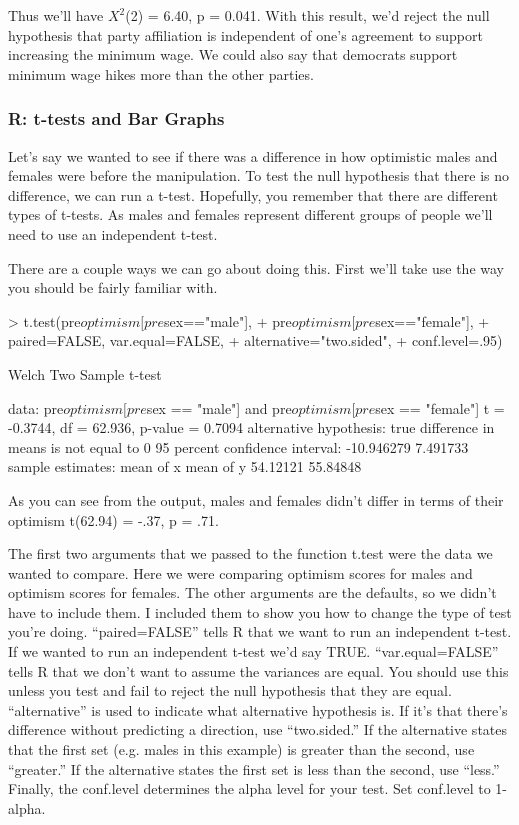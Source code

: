 \documentclass[12pt]{article}
\begin{document}
Thus we'll have $X^{2}$(2) = 
6.40, p = 
0.041. With this result, we'd reject the
null hypothesis that party affiliation is independent of one's agreement to support
increasing the minimum wage. We could also say that democrats support minimum wage hikes
more than the other parties.

\subsubsection{R: t-tests and Bar Graphs}
Let's say we wanted to see if there was a difference in how optimistic males and females
were before the manipulation. To test the null hypothesis that there is no difference,
we can run a t-test. Hopefully, you remember that there are different types of t-tests.
As males and females represent different groups of people we'll need to use an
independent t-test.

There are a couple ways we can go about doing this. First we'll take use the
way you should be fairly familiar with.

\begin{Schunk}
\begin{Sinput}
> t.test(pre$optimism[pre$sex=="male"],
+        pre$optimism[pre$sex=="female"],
+        paired=FALSE, var.equal=FALSE,
+        alternative="two.sided",
+        conf.level=.95)
\end{Sinput}
\begin{Soutput}
	Welch Two Sample t-test

data:  pre$optimism[pre$sex == "male"] and pre$optimism[pre$sex == "female"]
t = -0.3744, df = 62.936, p-value = 0.7094
alternative hypothesis: true difference in means is not equal to 0
95 percent confidence interval:
 -10.946279   7.491733
sample estimates:
mean of x mean of y 
 54.12121  55.84848 
\end{Soutput}
\end{Schunk}

As you can see from the output, males and females didn't differ in terms of their optimism
t(62.94) = -.37, p = .71.

The first two arguments that we passed to the function t.test were the data we wanted to
compare. Here we were comparing optimism scores for males and optimism scores for
females. The other arguments are the defaults, so we didn't have to include them. I
included them to show you how to change the type of test you're doing. ``paired=FALSE'' tells
R that we want to run an independent t-test. If we wanted to run an independent t-test
we'd say TRUE. ``var.equal=FALSE'' tells R that we don't want to assume the variances
are equal. You should use this unless you test and fail to reject the null hypothesis
that they are equal. ``alternative'' is used to indicate what alternative hypothesis is.
If it's that there's difference without predicting a direction, use ``two.sided.''
If the alternative states that the first set (e.g. males in this example) is greater
than the second, use ``greater.'' If the alternative states the first set is less than
the second, use ``less.'' Finally, the conf.level determines the alpha level for your
test. Set conf.level to 1-alpha.
\end{document}
